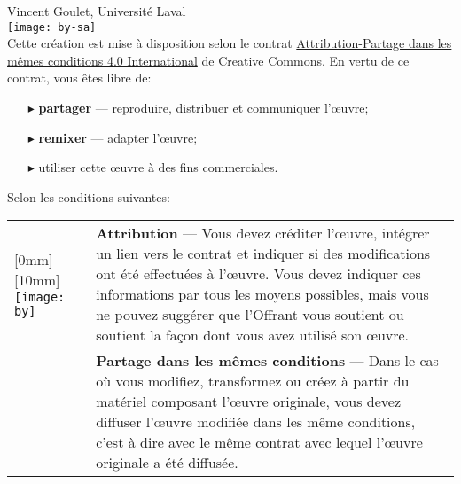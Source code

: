 
\begin{frame}[t,plain]
  \tiny
  \vspace*{10mm}

  {\textcopyright} {\year} Vincent Goulet, Université Laval \\[4mm]

  \texttt{[image: by-sa]} \\%

  Cette création est mise à disposition selon le contrat
  \href{http://creativecommons.org/licenses/by-sa/4.0/deed.fr}{%
    Attribution-Partage dans les mêmes conditions 4.0 International}
  de Creative Commons. En vertu de ce contrat, vous êtes libre de:
  \begin{itemize}
  \item[\color{black}\tiny$\blacktriangleright$]%
    \textbf{partager} --- reproduire, distribuer et communiquer
    l'{\oe}uvre;
  \item[\color{black}\tiny$\blacktriangleright$]%
    \textbf{remixer} --- adapter l'{\oe}uvre;
  \item[\color{black}\tiny$\blacktriangleright$]
    utiliser cette {\oe}uvre à des fins commerciales.
  \end{itemize}
  Selon les conditions suivantes:
  \vspace*{2mm}

  \begin{tabularx}{\linewidth}{@{}lX@{}}
    \raisebox{-5.5mm}[0mm][10mm]{%
      \texttt{[image: by]}}
    & \textbf{Attribution} --- Vous devez créditer l'{\oe}uvre, intégrer
      un lien vers le contrat et indiquer si des modifications ont été
      effectuées à l'{\oe}uvre. Vous devez indiquer ces informations par
      tous les moyens possibles, mais vous ne pouvez suggérer que
      l'Offrant vous soutient ou soutient la façon dont vous avez
      utilisé son {\oe}uvre. \\
    \raisebox{-5.5mm}{\texttt{[image: sa]}}
    & \textbf{Partage dans les mêmes conditions} --- Dans le cas où
      vous modifiez, transformez ou créez à partir du matériel composant
      l'{\oe}uvre originale, vous devez diffuser l'{\oe}uvre modifiée
      dans les même conditions, c'est à dire avec le même contrat avec
      lequel l'{\oe}uvre originale a été diffusée.
  \end{tabularx}
  \vspace*{4mm}


\end{frame}
